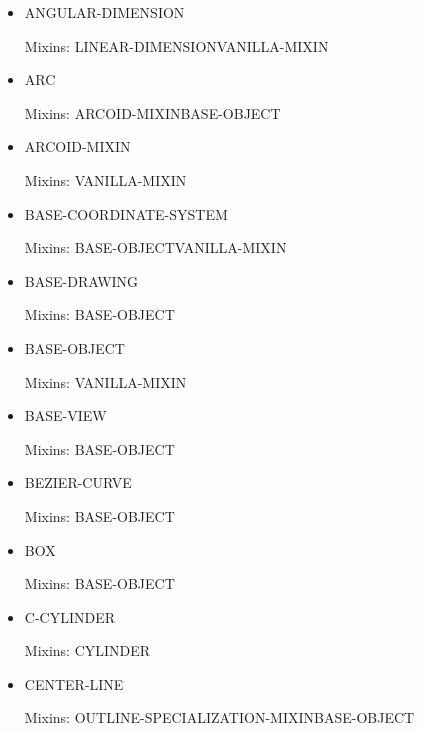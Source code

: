 \documentclass [11pt]{book}
\begin{document}
\begin{itemize}

\item {}ANGULAR-DIMENSION

Mixins: LINEAR-DIMENSIONVANILLA-MIXIN



\item {}ARC

Mixins: ARCOID-MIXINBASE-OBJECT



\item {}ARCOID-MIXIN

Mixins: VANILLA-MIXIN



\item {}BASE-COORDINATE-SYSTEM

Mixins: BASE-OBJECTVANILLA-MIXIN



\item {}BASE-DRAWING

Mixins: BASE-OBJECT



\item {}BASE-OBJECT

Mixins: VANILLA-MIXIN



\item {}BASE-VIEW

Mixins: BASE-OBJECT



\item {}BEZIER-CURVE

Mixins: BASE-OBJECT



\item {}BOX

Mixins: BASE-OBJECT



\item {}C-CYLINDER

Mixins: CYLINDER



\item {}CENTER-LINE

Mixins: OUTLINE-SPECIALIZATION-MIXINBASE-OBJECT




\end{itemize}
\end{document}
